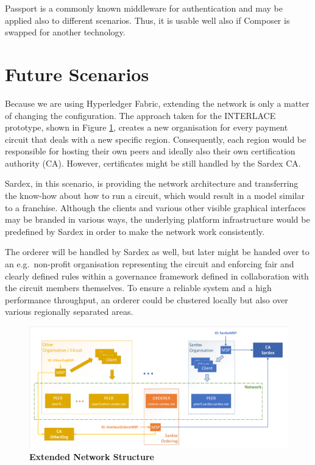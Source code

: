 Passport is a commonly known middleware for authentication and may be applied also to different scenarios. Thus, it is usable well also if Composer is swapped for another technology.

\section{Future Scenarios}
\label{sec:future-scene}

Because we are using Hyperledger Fabric, extending the network is only a matter of changing the configuration. The approach taken for the INTERLACE prototype, shown in Figure \ref{fig:prototype-net-ext}, creates a new organisation for every payment circuit that deals with a new specific region. Consequently, each region would be responsible for hosting their own peers and ideally also their own certification authority (CA). However, certificates might be still handled by the Sardex CA. 

Sardex, in this scenario, is providing the network architecture and transferring the know-how about how to run a circuit, which would result in a model similar to a franchise. Although the clients and various other visible graphical interfaces may be branded in various ways, the underlying platform infrastructure would be predefined by Sardex in order to make the network work consistently.

The orderer will be handled by Sardex as well, but later might be handed over to an e.g.\ non-profit organisation representing the circuit and enforcing fair and clearly defined rules within a governance framework defined in collaboration with the circuit members themselves. To ensure a reliable system and a high performance throughput, an orderer could be clustered locally but also over various regionally separated areas.

\begin{figure}[htbp]
  \centering
  \includegraphics[width=1.0\textwidth, clip, trim=1mm 1mm 1mm 1mm]{Figures/extended-network}
  \caption{\bf\small Extended Network Structure}
  \label{fig:prototype-net-ext}
\end{figure}


